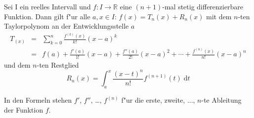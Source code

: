 \documentclass{article}
\begin{document}
\pagestyle{empty}

Sei I ein reelles Intervall und $f:I\to\mathbb{R}$ eine $(n+1)$-mal stetig differenzierbare Funktion. Dann gilt f"ur alle $a, x\in I$:
				\(f(x) = T_n(x) + R_n(x)\)
				mit dem $n$-ten Taylorpolynom an der Entwicklungsstelle $a$
				\begin{eqnarray*}
				T_(x) & = & \sum_{k=0}^n \frac{f^{(k)}(x)}{k!}(x-a)^k \\
				      & = & f(a) + \frac{f'(a)}{1!} (x-a) + \frac{f''(a)}{2!} (x-a)^2 + \cdots + \frac{f^{(n)}(x)}{n!} (x-a)^n
				\end{eqnarray*}
				und dem $n$-ten Restglied
				\[R_n(x) = \int_a^x \frac{(x-t)^n}{n!} f^{(n+1)}(t)\;\mathrm{d}t\]
				
				In den Formeln stehen $f'$, $f''$, \dots, $f^{(n)}$ f"ur die erste, zweite, ..., $n$-te Ableitung der Funktion $f$.
\end{document}
